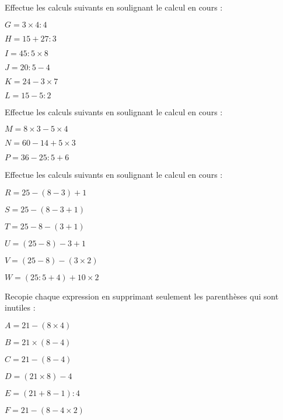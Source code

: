 \begin{exercice}
Effectue les calculs suivants en soulignant le calcul en cours :

$G = 3 \times 4 : 4$ \dotfill

\dotfill

$H = 15 + 27 : 3$ \dotfill

\dotfill
	
$I = 45 : 5 \times 8$ \dotfill

\dotfill
	
$J = 20 : 5 - 4$ \dotfill	

\dotfill
	
$K = 24 - 3 \times 7$ \dotfill

\dotfill
	
$L = 15 - 5 : 2$ \dotfill

\dotfill
\end{exercice}


\begin{exercice}
Effectue les calculs suivants en soulignant le calcul en cours :

$M = 8 \times 3 - 5 \times 4$ \dotfill

\dotfill

$N = 60 - 14 + 5 \times 3$ \dotfill

\dotfill

$P = 36 - 25 : 5 + 6$ \dotfill

\dotfill
\end{exercice}


\begin{exercice}
Effectue les calculs suivants en soulignant le calcul en cours :

$R = 25 - ( 8 - 3 ) + 1$ \dotfill

\dotfill

$S = 25 - ( 8 - 3 + 1)$ \dotfill

\dotfill	

$T = 25 - 8 - ( 3 + 1 )$ \dotfill

\dotfill	

$U = ( 25 - 8 ) - 3 + 1$ \dotfill

\dotfill	

$V = ( 25 - 8 ) - ( 3 \times 2 )$ \dotfill 

\dotfill	

$W = ( 25 : 5 + 4 ) + 10 \times 2$ \dotfill

\dotfill
\end{exercice}


\begin{exercice}
Recopie chaque expression en supprimant seulement les parenthèses qui sont inutiles :

$A = 21 - ( 8 \times 4 )$ \dotfill

$B = 21 \times ( 8 - 4 )$ \dotfill

$C = 21 - ( 8 - 4 )$ \dotfill

$D = ( 21 \times 8 ) - 4$ \dotfill

$E = ( 21 + 8 - 1 ) : 4$  \dotfill

$F = 21 - ( 8 - 4 \times 2 )$ \dotfill
\end{exercice}


